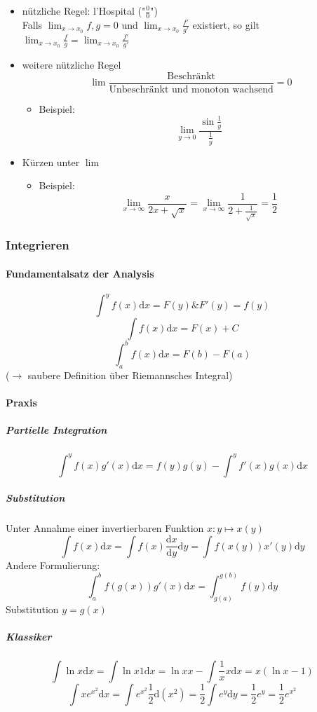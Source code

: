 \documentclass[a4paper]{scrartcl}
\theoremstyle{definition}
\theoremstyle{plain}
\theoremstyle{remark}
\theoremstyle{remark}
\begin{document}
\begin{itemize}
\begin{itemize}
\item nützliche Regel: l'Hospital ("$\frac{0}{0}$") \\
                Falls $\lim_{x\to x_0} f,g = 0$ und $\lim_{x\to x_0} \frac{f'}{g'}$ existiert, so gilt $\lim_{x\to x_0}\frac{f}{g} = \lim_{x\to x_0} \frac{f'}{g'}$
\item weitere nützliche Regel \[\lim \frac{\text{Beschränkt}}{\text{Unbeschränkt und monoton wachsend}} = 0\]
\begin{itemize}
\item Beispiel: \[\lim_{y\to 0} \frac{\sin{\frac{1}{y}}}{\frac{1}{y}}\]
\end{itemize}
\item Kürzen unter $\lim$
\begin{itemize}
\item Beispiel: \[\lim_{x\to\infty} \frac{x}{2x + \sqrt{x}} = \lim_{x\to\infty}\frac{1}{2+\frac{1}{\sqrt{x}}} = \frac{1}{2}\]
\end{itemize}
\end{itemize}
\end{itemize}
\subsubsection{Integrieren}
\label{sec-2-2-3}
\paragraph{Fundamentalsatz der Analysis}
\label{sec-2-2-3-1}
\[\int^y f(x)\mathrm{d}x = F(y) \&  F'(y) = f(y)\]
\[\int f(x)\mathrm{d}x = F(x) + C\]
\[\int_a^b f(x)\mathrm{d}x = F(b) - F(a)\]
($\to$ saubere Definition über Riemannsches Integral)
\paragraph{Praxis}
\label{sec-2-2-3-2}
\subparagraph{Partielle Integration}
\label{sec-2-2-3-2-1}
\[\int^y f(x)g'(x)\mathrm{d}x = f(y)g(y) - \int^y f'(x)g(x)\mathrm{d}x\]
\subparagraph{Substitution}
\label{sec-2-2-3-2-2}
Unter Annahme einer invertierbaren Funktion $x: y\mapsto x(y)$
\[\int f(x)\mathrm{d}x = \int f(x)\frac{\mathrm{d}x}{\mathrm{d}y}\mathrm{d}y = \int f(x(y)) x'(y)\mathrm{d}y\]
Andere Formulierung: \[\int_a^b f(g(x))g'(x)\mathrm{d}x = \int_{g(a)}^{g(b)}f(y)\mathrm{d}y\]
Substitution $y=g(x)$
\subparagraph{Klassiker}
\label{sec-2-2-3-2-3}
\[\int \ln{x}\mathrm{d}x = \int \ln{x}1\mathrm{d}x = \ln{x}x - \int \frac{1}{x}x\mathrm{d}x = x(\ln{x} - 1)\]
\[\int x e^{x^2}\mathrm{d}x = \int e^{x^2}\frac{1}{2}\mathrm{d}(x^2) = \frac{1}{2}\int e^y \mathrm{d}y = \frac{1}{2}e^y = \frac{1}{2}e^{x^2}\]
\end{document}
